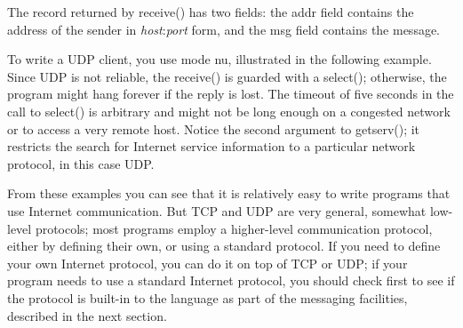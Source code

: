 The record returned by \textsf{receive()} has two fields: the
\textsf{addr} field contains the address of the sender in
\textsf{{\textquotedbl}}\textsf{\textit{host}}\textsf{:}\textsf{\textit{port}}\textsf{{\textquotedbl}}
form, and the \textsf{msg} field contains the message.

To write a UDP client, you use mode
\textsf{{\textquotedbl}nu{\textquotedbl}}, illustrated in the following
example. Since UDP is not reliable, the \textsf{receive()} is guarded
with a \textsf{select()}; otherwise, the program might hang forever if
the reply is lost. The timeout of five seconds in the call to
\textsf{select()} is arbitrary and might not be long enough on a
congested network or to access a very remote host. Notice the second
argument to \textsf{getserv()}; it restricts the search for Internet
service information to a particular network protocol, in this case UDP.


From these examples you can see that it is relatively easy to write
programs that use Internet communication. But TCP and UDP are very
general, somewhat low-level protocols; most programs employ a
higher-level communication protocol, either by defining their own, or
using a standard protocol. If you need to define your own Internet
protocol, you can do it on top of TCP or UDP; if your program needs to
use a standard Internet protocol, you should check first to see if the
protocol is built-in to the language as part of the messaging
facilities, described in the next section.

